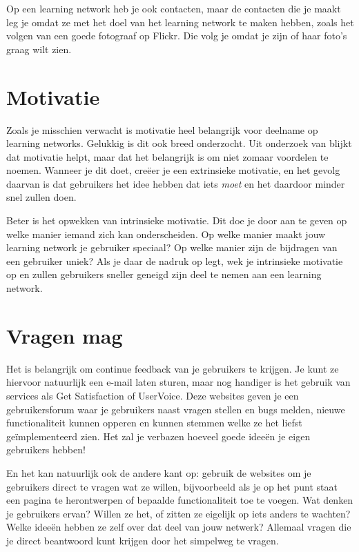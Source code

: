 \documentclass[a4paper, 10pt, pdftex]{report}
\begin{document}
    Op een learning network heb je ook contacten, maar de contacten die je maakt leg je omdat ze met het doel van het learning network te maken hebben, zoals het volgen van een goede fotograaf op Flickr. Die volg je omdat je zijn of haar foto's graag wilt zien.

    \section{Motivatie}
      Zoals je misschien verwacht is motivatie heel belangrijk voor deelname op learning networks. Gelukkig is dit ook breed onderzocht. Uit onderzoek van \cite{Beenen2004} blijkt dat motivatie helpt, maar dat het belangrijk is om niet zomaar voordelen te noemen. Wanneer je dit doet, cre\"eer je een extrinsieke motivatie, en het gevolg daarvan is dat gebruikers het idee hebben dat iets \emph{moet} en het daardoor minder snel zullen doen.

      Beter is het opwekken van intrinsieke motivatie. Dit doe je door aan te geven op welke manier iemand zich kan onderscheiden. Op welke manier maakt jouw learning network je gebruiker speciaal? Op welke manier zijn de bijdragen van een gebruiker uniek? Als je daar de nadruk op legt, wek je intrinsieke motivatie op en zullen gebruikers sneller geneigd zijn deel te nemen aan een learning network.

    \section{Vragen mag}
      Het is belangrijk om continue feedback van je gebruikers te krijgen. Je kunt ze hiervoor natuurlijk een e-mail laten sturen, maar nog handiger is het gebruik van services als Get Satisfaction of UserVoice. Deze websites geven je een gebruikersforum waar je gebruikers naast vragen stellen en bugs melden, nieuwe functionaliteit kunnen opperen en kunnen stemmen welke ze het liefst ge\"implementeerd zien. Het zal je verbazen hoeveel goede idee\"en je eigen gebruikers hebben!

      En het kan natuurlijk ook de andere kant op: gebruik de websites om je gebruikers direct te vragen wat ze willen, bijvoorbeeld als je op het punt staat een pagina te herontwerpen of bepaalde functionaliteit toe te voegen. Wat denken je gebruikers ervan? Willen ze het, of zitten ze eigelijk op iets anders te wachten? Welke idee\"en hebben ze zelf over dat deel van jouw netwerk? Allemaal vragen die je direct beantwoord kunt krijgen door het simpelweg te vragen.
\end{document}
